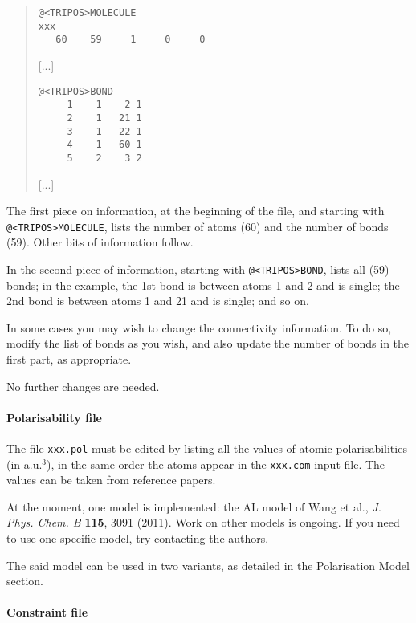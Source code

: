 \documentclass[a4paper]{report}
\begin{document}
\begin{framed}
\begin{quote}
\begin{verbatim}
@<TRIPOS>MOLECULE
xxx
   60    59     1     0     0
\end{verbatim}

[...]

\begin{verbatim}
@<TRIPOS>BOND
     1    1    2 1
     2    1   21 1
     3    1   22 1
     4    1   60 1
     5    2    3 2
\end{verbatim}
[...]

\end{quote}
\end{framed}

The first piece on information, at the beginning of the file, and starting with
\texttt{@<TRIPOS>MOLECULE}, lists the number of atoms (60) and the number of bonds
(59). Other bits of information follow.

In the second piece of information, starting with \texttt{@<TRIPOS>BOND}, lists all
(59) bonds; in the example, the 1st bond is between atoms 1 and 2 and is single; the 2nd
bond is between atoms 1 and 21 and is single; and so on.

In some cases you may wish to change the connectivity information. To do so, modify
the list of bonds as you wish, and also update the number of bonds in the first part,
as appropriate.

No further changes are needed. 

\paragraph*{Polarisability file}

The file \texttt{xxx.pol} must be edited by listing all the values of atomic
polarisabilities (in a.u.$^3$), in the same order the atoms appear in the
\texttt{xxx.com} input file. The values can be taken from reference papers. 

At the moment, one model is implemented: the AL model of Wang et al., \emph{J.
Phys. Chem. B} \textbf{115}, 3091 (2011). Work on other models is ongoing. If you need to use one specific model, try contacting the authors.

The said model can be used in two variants, as detailed in the Polarisation Model section.

\paragraph*{Constraint file}
\end{document}
